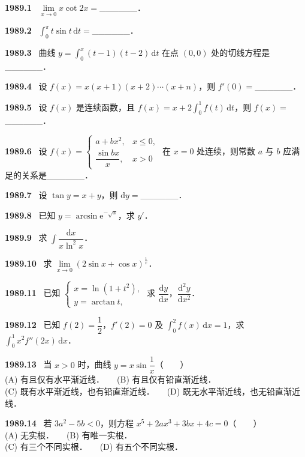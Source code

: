\documentclass[UTF8,12pt]{ctexart}
\newcommand{\qn}[1]{\textbf{\large #1}\ }
\begin{document}
\qn{1989.1}
$\lim\limits_{x\to0}x\cot 2x=$______．

\vfill
\newpage
\qn{1989.2}
$\int_0^\pi t\sin t\,\mathrm{d}t=$______．

\vfill
\newpage
\qn{1989.3}
曲线 $y=\int_0^x(t-1)(t-2)\,\mathrm{d}t$ 在点 $(0,0)$ 处的切线方程是______．

\vfill
\newpage
\qn{1989.4}
设 $f(x)=x(x+1)(x+2)\cdots(x+n)$，则 $f'(0)=$______．

\vfill
\newpage
\qn{1989.5}
设 $f(x)$ 是连续函数，且 $f(x)=x+2\int_0^1 f(t)\,\mathrm{d}t$，则 $f(x)=$______．

\vfill
\newpage
\qn{1989.6}
设 $f(x)=\begin{cases} a+bx^2, & x\leqslant 0, \\ \dfrac{\sin bx}{x}, & x>0 \end{cases}$ 在 $x=0$ 处连续，则常数 $a$ 与 $b$ 应满足的关系是______．

\vfill
\newpage
\qn{1989.7}
设 $\tan y=x+y$，则 $\mathrm{d}y=$______．

\vfill
\newpage
\qn{1989.8}
已知 $y=\arcsin\mathrm{e}^{-\sqrt{x}}$，求 $y'$．

\vfill
\newpage
\qn{1989.9}
求 $\int\dfrac{\mathrm{d}x}{x\ln^2x}$．

\vfill
\newpage
\qn{1989.10}
求 $\lim\limits_{x\to0}(2\sin x+\cos x)^{\frac{1}{x}}$．

\vfill
\newpage
\qn{1989.11}
已知 $\begin{cases} x=\ln(1+t^2), \\ y=\arctan t, \end{cases}$ 求 $\dfrac{\mathrm{d}y}{\mathrm{d}x}$，$\dfrac{\mathrm{d}^2y}{\mathrm{d}x^2}$．

\vfill
\newpage
\qn{1989.12}
已知 $f(2)=\dfrac{1}{2}$，$f'(2)=0$ 及 $\int_0^2 f(x)\,\mathrm{d}x=1$，求 $\int_0^1 x^2 f''(2x)\,\mathrm{d}x$．

\vfill
\newpage
\qn{1989.13}
当 $x>0$ 时，曲线 $y=x\sin\dfrac{1}{x}$（　　）
\\
\noindent (A) 有且仅有水平渐近线．　　(B) 有且仅有铅直渐近线．
\\
\noindent (C) 既有水平渐近线，也有铅直渐近线．　　(D) 既无水平渐近线，也无铅直渐近线．

\vfill
\newpage
\qn{1989.14}
若 $3a^2-5b<0$，则方程 $x^5+2ax^3+3bx+4c=0$（　　）
\\
\noindent (A) 无实根．　　(B) 有唯一实根．
\\
\noindent (C) 有三个不同实根．　　(D) 有五个不同实根．
\end{document}
